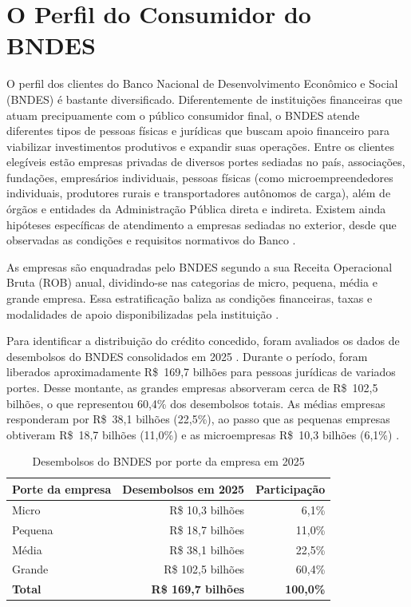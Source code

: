 \chapter{O Perfil do Consumidor do BNDES}

O perfil dos clientes do Banco Nacional de Desenvolvimento Econômico e Social (BNDES) é bastante diversificado. Diferentemente de instituições financeiras que atuam precipuamente com o público consumidor final, o BNDES atende diferentes tipos de pessoas físicas e jurídicas que buscam apoio financeiro para viabilizar investimentos produtivos e expandir suas operações. Entre os clientes elegíveis estão empresas privadas de diversos portes sediadas no país, associações, fundações, empresários individuais, pessoas físicas (como microempreendedores individuais, produtores rurais e transportadores autônomos de carga), além de órgãos e entidades da Administração Pública direta e indireta. Existem ainda hipóteses específicas de atendimento a empresas sediadas no exterior, desde que observadas as condições e requisitos normativos do Banco \cite{bndes2026cliente}.

As empresas são enquadradas pelo BNDES segundo a sua Receita Operacional Bruta (ROB) anual, dividindo-se nas categorias de micro, pequena, média e grande empresa. Essa estratificação baliza as condições financeiras, taxas e modalidades de apoio disponibilizadas pela instituição \cite{bndes2026cliente}.

Para identificar a distribuição do crédito concedido, foram avaliados os dados de desembolsos do BNDES consolidados em 2025 \cite{bndes_estatisticas_desembolsos_2026}. Durante o período, foram liberados aproximadamente R\$~169,7 bilhões para pessoas jurídicas de variados portes. Desse montante, as grandes empresas absorveram cerca de R\$~102,5 bilhões, o que representou 60,4\% dos desembolsos totais. As médias empresas responderam por R\$~38,1 bilhões (22,5\%), ao passo que as pequenas empresas obtiveram R\$~18,7 bilhões (11,0\%) e as microempresas R\$~10,3 bilhões (6,1\%) \cite{bndes_estatisticas_desembolsos_2026}.

\begin{table}[htbp]
  \centering
  \caption{Desembolsos do BNDES por porte da empresa em 2025}
  \label{tab:desembolsos_porte_2025}
  \begin{tabular}{lrr}
    \hline
    \textbf{Porte da empresa} & \textbf{Desembolsos em 2025} & \textbf{Participação} \\
    \hline
    Micro   & R\$ 10,3 bilhões  & 6,1\%  \\
    Pequena & R\$ 18,7 bilhões  & 11,0\% \\
    Média   & R\$ 38,1 bilhões  & 22,5\% \\
    Grande  & R\$ 102,5 bilhões & 60,4\% \\
    \hline
    \textbf{Total} & \textbf{R\$ 169,7 bilhões} & \textbf{100,0\%} \\
    \hline
  \end{tabular}
\end{table}

